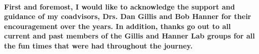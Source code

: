 \begin{acknowledgements}\label{acknow}
\ssp
\paragraph*{First and foremost, I would like to acknowledge the support and guidance of my coadvisors, Drs. Dan Gillis and Bob Hanner for their encouragement over the years. In addition, thanks go out to all current and past members of the Gillis and Hanner Lab groups for all the fun times that were had throughout the journey. } 

\paragraph*{} 

\end{acknowledgements}
\dsp
